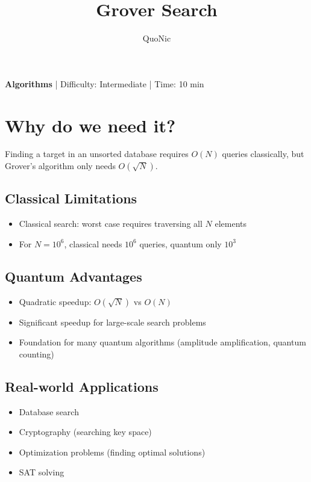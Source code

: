\documentclass[12pt,a4paper]{article}
\title{Grover Search}
\author{QuoNic}
\date{}
\begin{document}
\maketitle

\begin{center}
\textbf{Algorithms} | Difficulty: Intermediate | Time: 10 min
\end{center}

\tableofcontents
\newpage

\section{Why do we need it?}

Finding a target in an unsorted database requires $O(N)$ queries classically, but Grover's algorithm only needs $O(\sqrt{N})$.

\subsection{Classical Limitations}
\begin{itemize}
  \item Classical search: worst case requires traversing all $N$ elements
  \item For $N=10^6$, classical needs $10^6$ queries, quantum only $10^3$
\end{itemize}

\subsection{Quantum Advantages}
\begin{itemize}
  \item Quadratic speedup: $O(\sqrt{N})$ vs $O(N)$
  \item Significant speedup for large-scale search problems
  \item Foundation for many quantum algorithms (amplitude amplification, quantum counting)
\end{itemize}

\subsection{Real-world Applications}
\begin{itemize}
  \item Database search
  \item Cryptography (searching key space)
  \item Optimization problems (finding optimal solutions)
  \item SAT solving
\end{itemize}
\end{document}
